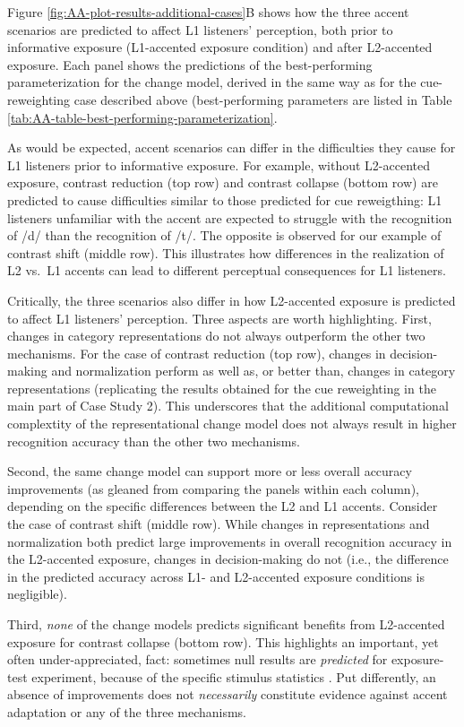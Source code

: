 \documentclass[
  11pt,
  man,floatsintext]{apa6}
\begin{document}
Figure \ref{fig:AA-plot-results-additional-cases}B shows how the three accent scenarios are predicted to affect L1 listeners' perception, both prior to informative exposure (L1-accented exposure condition) and after L2-accented exposure. Each panel shows the predictions of the best-performing parameterization for the change model, derived in the same way as for the cue-reweighting case described above (best-performing parameters are listed in Table \ref{tab:AA-table-best-performing-parameterization}.

As would be expected, accent scenarios can differ in the difficulties they cause for L1 listeners prior to informative exposure. For example, without L2-accented exposure, contrast reduction (top row) and contrast collapse (bottom row) are predicted to cause difficulties similar to those predicted for cue reweigthing: L1 listeners unfamiliar with the accent are expected to struggle with the recognition of /d/ than the recognition of /t/. The opposite is observed for our example of contrast shift (middle row). This illustrates how differences in the realization of L2 vs.~L1 accents can lead to different perceptual consequences for L1 listeners.

Critically, the three scenarios also differ in how L2-accented exposure is predicted to affect L1 listeners' perception. Three aspects are worth highlighting. First, changes in category representations do not always outperform the other two mechanisms. For the case of contrast reduction (top row), changes in decision-making and normalization perform as well as, or better than, changes in category representations (replicating the results obtained for the cue reweighting in the main part of Case Study 2). This underscores that the additional computational complextity of the representational change model does not always result in higher recognition accuracy than the other two mechanisms.

Second, the same change model can support more or less overall accuracy improvements (as gleaned from comparing the panels within each column), depending on the specific differences between the L2 and L1 accents. Consider the case of contrast shift (middle row). While changes in representations and normalization both predict large improvements in overall recognition accuracy in the L2-accented exposure, changes in decision-making do not (i.e., the difference in the predicted accuracy across L1- and L2-accented exposure conditions is negligible).

Third, \emph{none} of the change models predicts significant benefits from L2-accented exposure for contrast collapse (bottom row). This highlights an important, yet often under-appreciated, fact: sometimes null results are \emph{predicted} for exposure-test experiment, because of the specific stimulus statistics \autocites[see][]{tan2021,zheng-samuel2020}. Put differently, an absence of improvements does not \emph{necessarily} constitute evidence against accent adaptation or any of the three mechanisms.
\end{document}
